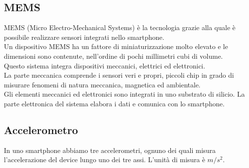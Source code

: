 \documentclass[12pt,a4paper,openright,twoside]{report}
\begin{document}
\subsection{MEMS}
MEMS (Micro Electro-Mechanical Systems) è la tecnologia grazie alla quale è possibile realizzare sensori integrati nello smartphone.\\
Un dispositivo MEMS ha un fattore di miniaturizzazione molto elevato e le dimensioni sono contenute, nell'ordine di pochi millimetri cubi di volume.\\
Questo sistema integra dispositivi meccanici, elettrici ed elettronici.\\
La parte meccanica comprende i sensori veri e propri, piccoli chip in grado di misurare fenomeni di natura meccanica, magnetica ed ambientale.\\
Gli elementi meccanici ed elettronici sono integrati in uno substrato di silicio. La parte elettronica del sistema elabora i dati e comunica con lo smartphone. \cite{K15}

\subsection{Accelerometro}
In uno smartphone abbiamo tre accelerometri, ognuno dei quali misura l'accelerazione del device lungo uno dei tre assi. L'unità di misura è $m/s^2$.
\end{document}
